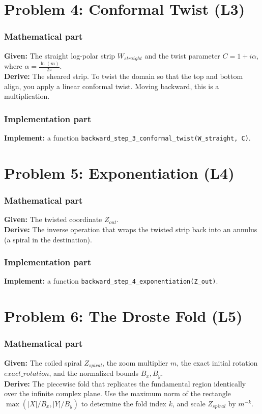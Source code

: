 \documentclass[11pt]{article}
\begin{document}
\section*{Problem 4: Conformal Twist (L3)}

\subsubsection*{Mathematical part}
\textbf{Given:} The straight log-polar strip $W_{straight}$ and the twist parameter $C = 1 + i \alpha$, where $\alpha = \frac{\ln(m)}{2\pi}$. \\
\textbf{Derive:} The sheared strip. To twist the domain so that the top and bottom align, you apply a linear conformal twist. Moving backward, this is a multiplication.

\subsubsection*{Implementation part}
\textbf{Implement:} a function \lstinline|backward_step_3_conformal_twist(W_straight, C)|.

\section*{Problem 5: Exponentiation (L4)}

\subsubsection*{Mathematical part}
\textbf{Given:} The twisted coordinate $Z_{out}$. \\
\textbf{Derive:} The inverse operation that wraps the twisted strip back into an annulus (a spiral in the destination). 

\subsubsection*{Implementation part}
\textbf{Implement:} a function \lstinline|backward_step_4_exponentiation(Z_out)|.

\section*{Problem 6: The Droste Fold (L5)}

\subsubsection*{Mathematical part}
\textbf{Given:} The coiled spiral $Z_{spiral}$, the zoom multiplier $m$, the exact initial rotation $exact\_rotation$, and the normalized bounds $B_x, B_y$. \\
\textbf{Derive:} The piecewise fold that replicates the fundamental region identically over the infinite complex plane. Use the maximum norm of the rectangle $\max(|X|/B_x, |Y|/B_y)$ to determine the fold index $k$, and scale $Z_{spiral}$ by $m^{-k}$.
\end{document}
